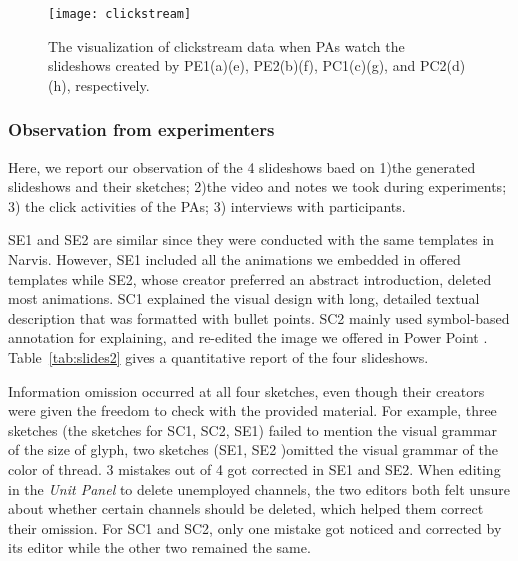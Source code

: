 \begin{figure}
 \centering %
 \texttt{[image: clickstream]}
 \caption{The visualization of clickstream data when PAs watch the slideshows created by PE1(a)(e), PE2(b)(f), PC1(c)(g), and PC2(d)(h), respectively. 
 }
 \label{fig:clickstream}
\end{figure}

\subsubsection{Observation from experimenters}

Here, we report our observation of the 4 slideshows baed on 1)the generated slideshows and their sketches; 2)the video and notes we took during experiments; 3) the click activities of the PAs; 3) interviews with participants.

SE1 and SE2 are similar since they were conducted with the same templates in Narvis. However, SE1 included all the animations we embedded in offered templates while SE2, whose creator preferred an abstract introduction, deleted most animations. SC1 explained the visual design with long, detailed textual description that was formatted with bullet points. SC2 mainly used symbol-based annotation for explaining, and re-edited the image we offered in Power Point . Table~\ref{tab:slides2} gives a quantitative report of the four slideshows.

Information omission occurred at all four sketches, even though their creators were given the freedom to check with the provided material. For example, three sketches (the sketches for SC1, SC2, SE1) failed to mention the visual grammar of the size of glyph, two sketches (SE1, SE2 )omitted the visual grammar of the color of thread. 3 mistakes out of 4 got corrected in SE1 and SE2. When editing in the \textit{Unit Panel} to delete unemployed channels, the two editors both felt unsure about whether certain channels should be deleted, which helped them correct their omission. 
For SC1 and SC2, only one mistake got noticed and corrected by its editor while the other two remained the same.

